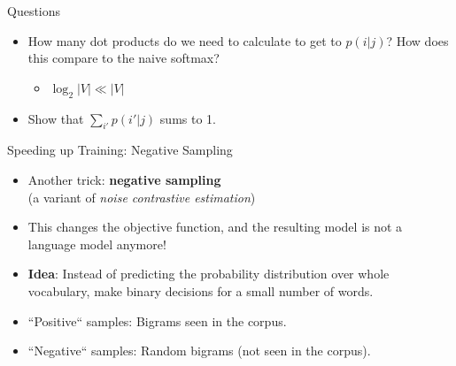 
\begin{vbframe}{Questions}

\vfill

\begin{itemize}
	\item \ques How many dot products do we need to calculate to get to $p(i|j)$? How does this compare to the naive softmax?
		\begin{itemize}
			\item $\log_2|V| \ll |V|$
		\end{itemize}
	\vskip5mm
	\item \ques Show that $\sum_{i'} p(i'|j)$ sums to 1.
\end{itemize}

\vfill

\end{vbframe}


\begin{vbframe}{Speeding up Training: Negative Sampling}

\vfill

\begin{itemize}
	\item Another trick: \textbf{negative sampling}\\ (a variant of \emph{noise contrastive estimation})
	\item This changes the objective function, and the resulting model is not a language model anymore!
	\item \textbf{Idea}: Instead of predicting the probability distribution over whole vocabulary, make binary decisions for a small number of words.
	\item ``Positive`` samples: Bigrams seen in the corpus.
	\item ``Negative`` samples: Random bigrams (not seen in the corpus).
\end{itemize}

\vfill

\end{vbframe}


